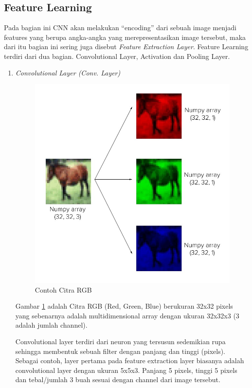 \subsection{Feature Learning}
\label{subsec:featurelearning}

Pada bagian ini CNN akan melakukan “encoding” dari sebuah image menjadi features yang berupa angka-angka yang merepresentasikan image tersebut, maka dari itu bagian ini sering juga disebut \textit{Feature Extraction Layer}. Feature Learning terdiri dari dua bagian. Convolutional Layer, Activation dan Pooling Layer.

\begin{enumerate}
	\item \textit{Convolutional Layer (Conv. Layer)}
	\begin{figure}[ht]
		\centering
		
		\includegraphics[width=0.7\columnwidth]{gambar/rgbhorse.jpeg}
		
		\caption{Contoh Citra RGB\citep{cit:cnn}}
		\label{fig:kudargb}
	\end{figure}
	
	Gambar \ref{fig:kudargb} adalah Citra RGB (Red, Green, Blue) berukuran 32x32 pixels yang sebenarnya adalah multidimensional array dengan ukuran 32x32x3 (3 adalah jumlah channel).
	
	Convolutional layer terdiri dari neuron yang tersusun sedemikian rupa sehingga membentuk sebuah filter dengan panjang dan tinggi (pixels). Sebagai contoh, layer pertama pada feature extraction layer biasanya adalah convolutional layer dengan ukuran 5x5x3. Panjang 5 pixels, tinggi 5 pixels dan tebal/jumlah 3 buah sesuai dengan channel dari image tersebut.
	

\end{enumerate}
